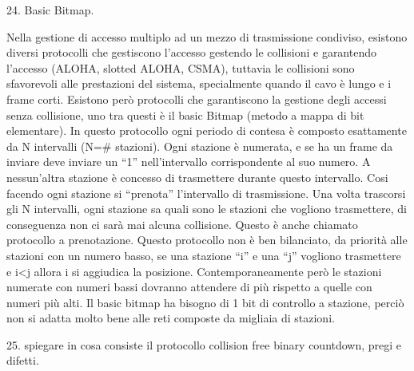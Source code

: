  


24.	Basic Bitmap.

Nella gestione di accesso multiplo ad un mezzo di trasmissione condiviso, esistono diversi protocolli che gestiscono l’accesso gestendo le collisioni e garantendo l’accesso (ALOHA, slotted ALOHA, CSMA), tuttavia le collisioni sono sfavorevoli alle prestazioni del sistema, specialmente quando il cavo è lungo e i frame corti.
Esistono però protocolli che garantiscono la gestione degli accessi senza collisione, uno tra questi è il basic Bitmap (metodo a mappa di bit elementare). In questo protocollo ogni periodo di contesa è composto esattamente da N intervalli (N=# stazioni). Ogni stazione è numerata, e se ha un frame da inviare deve inviare un “1” nell’intervallo corrispondente al suo numero. A nessun’altra stazione è concesso di trasmettere durante questo intervallo. Cosi facendo ogni stazione si “prenota” l’intervallo di trasmissione. Una volta trascorsi gli N intervalli, ogni stazione sa quali sono le stazioni che vogliono trasmettere, di conseguenza non ci sarà mai alcuna collisione.
Questo è anche chiamato protocollo a prenotazione.
Questo protocollo non è ben bilanciato, da priorità alle stazioni con un numero basso, se una stazione “i” e una “j” vogliono trasmettere e i<j allora i si aggiudica la posizione.
Contemporaneamente però le stazioni numerate con numeri bassi dovranno attendere di più rispetto a quelle con numeri più alti.
Il basic bitmap ha bisogno di 1 bit di controllo a stazione, perciò non si adatta molto bene alle reti composte da migliaia di stazioni.

25.	spiegare in cosa consiste il protocollo collision free binary countdown, pregi e difetti.

